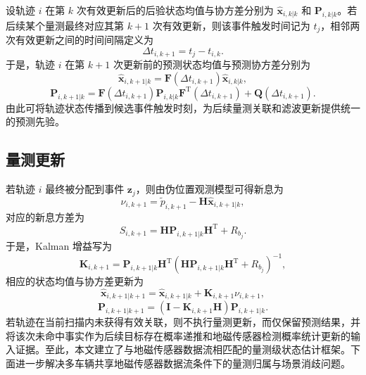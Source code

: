 \documentclass{xdupgthesis}
\begin{document}
设轨迹 $i$ 在第 $k$ 次有效更新后的后验状态均值与协方差分别为 $\hat{\mathbf x}_{i,k|k}$ 和 $\mathbf P_{i,k|k}$。若后续某个量测最终对应其第 $k+1$ 次有效更新，则该事件触发时间记为 $t_j$，相邻两次有效更新之间的时间间隔定义为
\begin{equation}
	\Delta t_{i,k+1}=t_j-t_{i,k}.
	\label{eq:ch3_dt_update}
\end{equation}
于是，轨迹 $i$ 在第 $k+1$ 次更新前的预测状态均值与预测协方差分别为
\begin{equation}
	\hat{\mathbf x}_{i,k+1|k}
	=
	\mathbf F\left(\Delta t_{i,k+1}\right)\hat{\mathbf x}_{i,k|k},
	\label{eq:ch3_predict_state}
\end{equation}
\begin{equation}
	\mathbf P_{i,k+1|k}
	=
	\mathbf F\left(\Delta t_{i,k+1}\right)
	\mathbf P_{i,k|k}
	\mathbf F^{\mathrm T}\left(\Delta t_{i,k+1}\right)
	+
	\mathbf Q\left(\Delta t_{i,k+1}\right).
	\label{eq:ch3_predict_cov}
\end{equation}
由此可将轨迹状态传播到候选事件触发时刻，为后续量测关联和滤波更新提供统一的预测先验。

\subsection{量测更新}

若轨迹 $i$ 最终被分配到事件 $\mathbf z_j$，则由伪位置观测模型可得新息为
\begin{equation}
	\nu_{i,k+1}=\tilde p_{i,k+1}-\mathbf H\hat{\mathbf x}_{i,k+1|k},
	\label{eq:ch3_innovation_event}
\end{equation}
对应的新息方差为
\begin{equation}
	S_{i,k+1}=\mathbf H\mathbf P_{i,k+1|k}\mathbf H^{\mathrm T}+R_{b_j}.
	\label{eq:ch3_S_event}
\end{equation}
于是，Kalman 增益写为
\begin{equation}
	\mathbf K_{i,k+1}
	=
	\mathbf P_{i,k+1|k}\mathbf H^{\mathrm T}
	\left(
	\mathbf H\mathbf P_{i,k+1|k}\mathbf H^{\mathrm T}+R_{b_j}
	\right)^{-1},
	\label{eq:ch3_K_event}
\end{equation}
相应的状态均值与协方差更新为
\begin{equation}
	\hat{\mathbf x}_{i,k+1|k+1}
	=
	\hat{\mathbf x}_{i,k+1|k}
	+
	\mathbf K_{i,k+1}\nu_{i,k+1},
	\label{eq:ch3_update_state_event}
\end{equation}
\begin{equation}
	\mathbf P_{i,k+1|k+1}
	=
	\left(\mathbf I-\mathbf K_{i,k+1}\mathbf H\right)\mathbf P_{i,k+1|k}.
	\label{eq:ch3_update_cov_event}
\end{equation}
若轨迹在当前扫描内未获得有效关联，则不执行量测更新，而仅保留预测结果，并将该次未命中事实作为后续目标存在概率递推和地磁传感器检测概率统计更新的输入证据。至此，本文建立了与地磁传感器数据流相匹配的量测级状态估计框架。下面进一步解决多车辆共享地磁传感器数据流条件下的量测归属与场景消歧问题。
\end{document}

